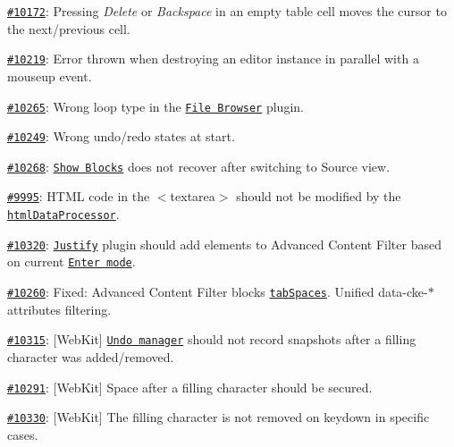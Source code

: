{\ttfamily 
\begin{DoxyItemize}
\item \href{http://dev.ckeditor.com/ticket/10172}{\tt \#10172}\+: Pressing {\itshape Delete} or {\itshape Backspace} in an empty table cell moves the cursor to the next/previous cell.
\item \href{http://dev.ckeditor.com/ticket/10219}{\tt \#10219}\+: Error thrown when destroying an editor instance in parallel with a {\ttfamily mouseup} event.
\item \href{http://dev.ckeditor.com/ticket/10265}{\tt \#10265}\+: Wrong loop type in the \href{http://ckeditor.com/addon/filebrowser}{\tt File Browser} plugin.
\item \href{http://dev.ckeditor.com/ticket/10249}{\tt \#10249}\+: Wrong undo/redo states at start.
\item \href{http://dev.ckeditor.com/ticket/10268}{\tt \#10268}\+: \href{http://ckeditor.com/addon/showblocks}{\tt Show Blocks} does not recover after switching to Source view.
\item \href{http://dev.ckeditor.com/ticket/9995}{\tt \#9995}\+: H\+T\+ML code in the {\ttfamily $<$textarea$>$} should not be modified by the \href{http://docs.ckeditor.com/#!/api/CKEDITOR.htmlDataProcessor}{\tt {\ttfamily html\+Data\+Processor}}.
\item \href{http://dev.ckeditor.com/ticket/10320}{\tt \#10320}\+: \href{http://ckeditor.com/addon/justify}{\tt Justify} plugin should add elements to Advanced Content Filter based on current \href{http://docs.ckeditor.com/#!/api/CKEDITOR.config-cfg-enterMode}{\tt Enter mode}.
\item \href{http://dev.ckeditor.com/ticket/10260}{\tt \#10260}\+: Fixed\+: Advanced Content Filter blocks \href{http://docs.ckeditor.com/#!/api/CKEDITOR.config-cfg-tabSpaces}{\tt {\ttfamily tab\+Spaces}}. Unified {\ttfamily data-\/cke-\/$\ast$} attributes filtering.
\item \href{http://dev.ckeditor.com/ticket/10315}{\tt \#10315}\+: \mbox{[}Web\+Kit\mbox{]} \href{http://docs.ckeditor.com/#!/api/CKEDITOR.plugins.undo.UndoManager}{\tt Undo manager} should not record snapshots after a filling character was added/removed.
\item \href{http://dev.ckeditor.com/ticket/10291}{\tt \#10291}\+: \mbox{[}Web\+Kit\mbox{]} Space after a filling character should be secured.
\item \href{http://dev.ckeditor.com/ticket/10330}{\tt \#10330}\+: \mbox{[}Web\+Kit\mbox{]} The filling character is not removed on {\ttfamily keydown} in specific cases.

\end{DoxyItemize}}
